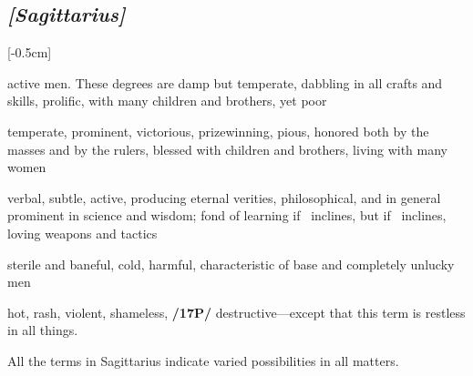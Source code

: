 \subsection{\textit{[Sagittarius]}}
\marginnote{\Sagittarius}[-0.5cm]
\vspace{-1mm}
\begin{description}[labelindent=0em , labelwidth=1em, labelsep=1em, leftmargin =!]
\item[\Jupiter]
	[0-11] active men. These degrees are damp but temperate,
dabbling in all crafts and skills, prolific, with many children and brothers, yet poor
\item[\Venus]
	[12-16] temperate, prominent, victorious, prizewinning, pious, honored both by the masses and by the rulers, blessed with children and brothers, living with many women
\item[\Mercury]
	[17-20] verbal, subtle, active, producing eternal verities, philosophical, and in general prominent in science and wisdom; fond of learning if \Mercury\, inclines, but if \Mars\, inclines, loving weapons and tactics	
\item[\Saturn]
	[21-25] sterile and baneful, cold, harmful, characteristic of base and completely unlucky men	
\item[\Mars]
	[26-29] hot, rash, violent, shameless, \textbf{/17P/} destructive—except that this term is restless in all things. 
\end{description}

\mndl[0.2cm]
All the terms in Sagittarius indicate varied possibilities in all matters.

